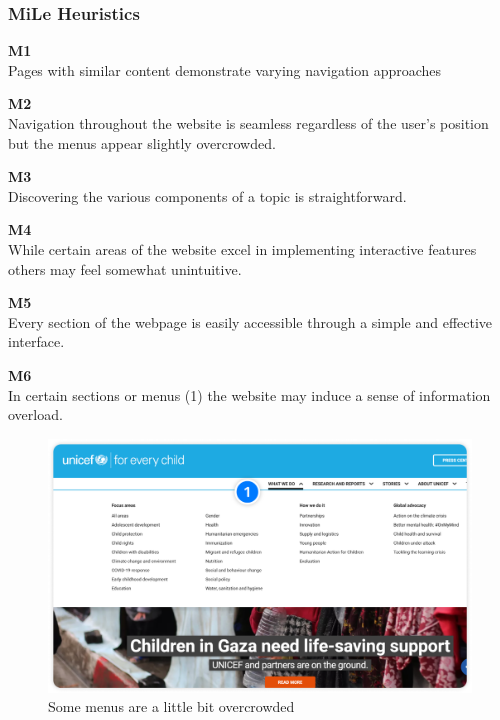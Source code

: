 \subsubsection{MiLe Heuristics}
\begin{description}
    \item {\textbf{M1} \color{unicefGray}{Interaction consistency}}\\
    Pages with similar content demonstrate varying navigation approaches
    \item {\textbf{M2} \color{unicefGray}{Group navigation}}\\
    Navigation throughout the website is seamless regardless of the user's position but the menus appear slightly overcrowded.
    \item {\textbf{M3} \color{unicefGray}{Navigation support}}\\
    Discovering the various components of a topic is straightforward.
    \item {\textbf{M4} \color{unicefGray}{User control}}\\
    While certain areas of the website excel in implementing interactive features others may feel somewhat unintuitive.
    \item {\textbf{M5} \color{unicefGray}{Error prevention}}\\
    Every section of the webpage is easily accessible through a simple and effective interface.
    \item {\textbf{M6} \color{unicefGray}{Information overload}}\\
    In certain sections or menus (1) the website may induce a sense of information overload.
    \begin{figure}[h]
        \centering
        \includegraphics[scale=0.20]{Resources/Dario/menu}
        \caption{Some menus are a little bit overcrowded}

\end{figure}
\end{description}
